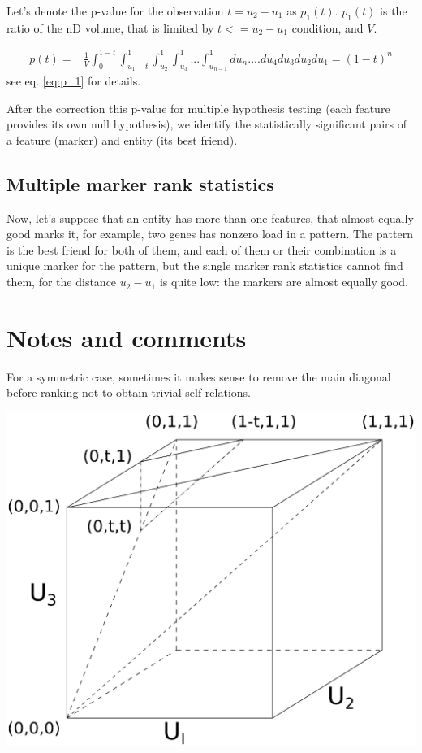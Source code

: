 \documentclass{llncs}
\begin{document}
Let's denote the p-value for the observation $t=u_2-u_1$ as $p_1(t)$. $p_1(t)$ is the ratio of the nD volume, that is limited by $t<=u_2-u_1$ condition, and $V$.

\begin{eqnarray*}
p(t) = & \displaystyle\frac{1}{V} \displaystyle \int_0^{1-t}\int_{{u_1}+t}^1\int_{u_2}^1\int_{u_3}^1...\int_{u_{n-1}}^1 du_n....du_4 du_3 du_2 du_1 = (1-t)^n
\end{eqnarray*}
see eq. \ref{eq:p_1} for details.

After the correction this p-value for multiple hypothesis testing (each feature provides its own null hypothesis), we identify the statistically significant pairs of a feature (marker) and entity (its best friend).

\subsection{Multiple marker rank statistics}
Now, let's suppose that an entity has more than one features, that almost equally good marks it, for example, two genes has nonzero load in a pattern. The pattern is the best friend for both of them, and each of them or their combination is a unique marker for the pattern, but the single marker rank statistics cannot find them, for the distance $u_2-u_1$ is quite low: the markers are almost equally good.

\section*{Notes and comments}

For a symmetric case, sometimes it makes sense to remove the main diagonal before ranking not to obtain trivial self-relations.

\includegraphics[scale=.5,trim=0 10cm 0 0, clip=true]{rank3d-nocolour}
\end{document}
